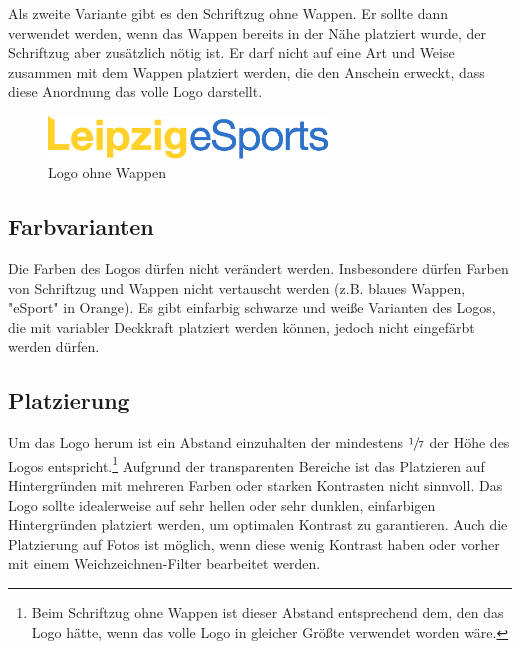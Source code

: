 \documentclass{article}
\begin{document}
Als zweite Variante gibt es den Schriftzug ohne Wappen.
Er sollte dann verwendet werden, wenn das Wappen bereits in der Nähe platziert wurde, der Schriftzug aber zusätzlich nötig ist.
Er darf nicht auf eine Art und Weise zusammen mit dem Wappen platziert werden, die den Anschein erweckt, dass diese Anordnung das volle Logo darstellt.

\begin{figure}[H]
\centering
\includegraphics[width=0.66\textwidth]{Docs/Type.eps}
\caption{Logo ohne Wappen}
\end{figure}


\subsection{Farbvarianten} \label{farbvarianten}

Die Farben des Logos dürfen nicht verändert werden. Insbesondere dürfen Farben von Schriftzug und Wappen nicht vertauscht werden (z.B. blaues Wappen, "eSport" in Orange). Es gibt einfarbig schwarze und weiße Varianten des Logos, die mit variabler Deckkraft platziert werden können, jedoch nicht eingefärbt werden dürfen.


\subsection{Platzierung}

Um das Logo herum ist ein Abstand einzuhalten der mindestens $\sfrac{1}{7}$ der Höhe des Logos entspricht.\footnote{Beim Schriftzug ohne Wappen ist dieser Abstand entsprechend dem, den das Logo hätte, wenn das volle Logo in gleicher Größte verwendet worden wäre.}
Aufgrund der transparenten Bereiche ist das Platzieren auf Hintergründen mit mehreren Farben oder starken Kontrasten nicht sinnvoll.
Das Logo sollte idealerweise auf sehr hellen oder sehr dunklen, einfarbigen Hintergründen platziert werden, um optimalen Kontrast zu garantieren.
Auch die Platzierung auf Fotos ist möglich, wenn diese wenig Kontrast haben oder vorher mit einem Weichzeichnen-Filter bearbeitet werden.
\end{document}
